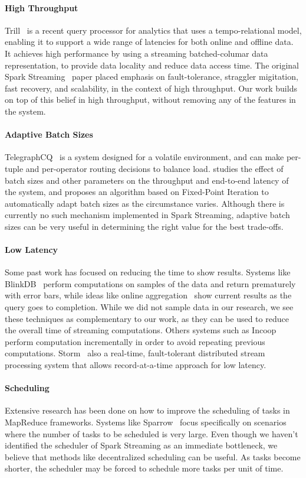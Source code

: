 \paragraph {\bf High Throughput} Trill~\cite{Trill} is a recent query processor for analytics that uses a tempo-relational model, enabling it to support a wide range of latencies for both online and offline data. It achieves high performance by using a streaming batched-columar data representation, to provide data locality and reduce data access time.
The original Spark Streaming~\cite{SparkStreaming} paper placed emphasis on fault-tolerance, straggler migitation, fast recovery, and scalability, in the context of high throughput. Our work builds on top of this belief in high throughput, without removing any of the features in the system.

\paragraph {\bf Adaptive Batch Sizes} TelegraphCQ~\cite{TelegraphCQ} is a system designed for a volatile environment, and can make per-tuple and per-operator routing decisions to balance load. \cite{das2014adaptive} studies the effect of batch sizes and other parameters on the throughput and end-to-end latency of the system, and proposes an algorithm based on Fixed-Point Iteration to automatically adapt batch sizes as the circumstance varies. Although there is currently no such mechanism implemented in Spark Streaming, adaptive batch sizes can be very useful in determining the right value for the best trade-offs.

\paragraph {\bf Low Latency} Some past work has focused on reducing the time to show results. Systems like BlinkDB~\cite{BlinkDB} perform computations on samples of the data and return prematurely with error bars, while ideas like online aggregation~\cite{OnlineAggregation} show current results as the query goes to completion.
While we did not sample data in our research, we see these techniques as complementary to our work, as they can be used to reduce the overall time of streaming computations.
Others systems such as Incoop~\cite{Incoop} perform computation incrementally in order to avoid repeating previous computations. Storm~\cite{Storm} also a real-time, fault-tolerant distributed stream processing system that allows record-at-a-time approach for low latency.

\paragraph {\bf Scheduling} Extensive research has been done on how to improve the scheduling of tasks in MapReduce frameworks. 
Systems like Sparrow~\cite{Sparrow} focus specifically on scenarios where the number of tasks to be scheduled is very large.
Even though we haven't identified the scheduler of Spark Streaming as an immediate bottleneck, we believe that methods like decentralized scheduling can be useful. As tasks become shorter, the scheduler may be forced to schedule more tasks per unit of time. 